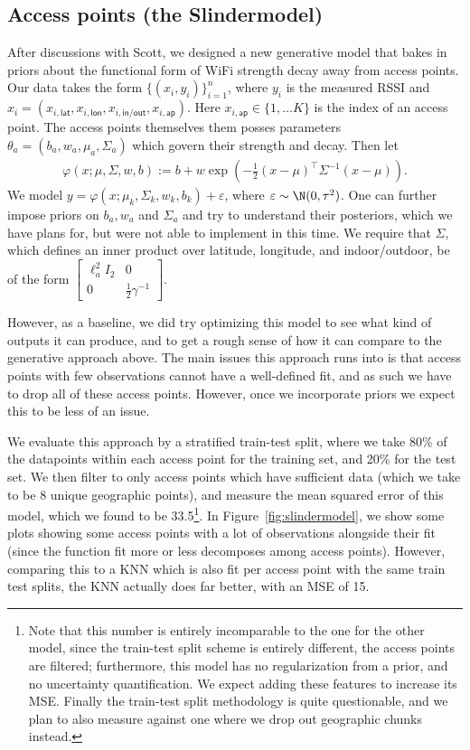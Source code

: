 \documentclass{article}
\newcommand{\sfio}{\mathsf{in/out}}
\newcommand{\sflat}{\mathsf{lat}}
\newcommand{\sflon}{\mathsf{lon}}
\newcommand{\sfap}{\mathsf{ap}}
\begin{document}
\subsection{Access points (the Slindermodel)}
After discussions with Scott, we designed a new generative model that bakes in priors about the functional form of WiFi strength decay away from access points. Our data takes the form $\{(x_i, y_i)\}_{i = 1} ^n$, where $y_i$ is the measured RSSI and $x_i = (x_{i,\sflat}, x_{i,\sflon}, x_{i,\sfio}, x_{i,\sfap})$. Here $x_{i,\sfap} \in \{1, \dots K\}$ is the index of an access point. The access points themselves them posses parameters $\theta_a = (b_a, w_a, \mu_a, \Sigma_a)$ which govern their strength and decay. 
Then let
\begin{align*}
    \varphi(x; \mu, \Sigma, w, b) := b + w \exp\left(-\frac{1}{2} (x - \mu)^\top \Sigma^{-1} (x - \mu) \right).
\end{align*}
We model $y = \varphi(x; \mu_k, \Sigma_k, w_k, b_k) + \varepsilon$, where $\varepsilon \sim \N(0, \tau^2)$. One can further impose priors on $b_a, w_a$ and $\Sigma_a$ and try to understand their posteriors, which we have plans for, but were not able to implement in this time. We require that $\Sigma$, which defines an inner product over latitude, longitude, and indoor/outdoor, be of the form $\begin{bmatrix}
    \ell_a^2 I_2 & 0 \\
    0 & \frac{1}{2} \gamma^{-1}
\end{bmatrix}$.

However, as a baseline, we did try optimizing this model to see what kind of outputs it can produce, and to get a rough sense of how it can compare to the generative approach above. The main issues this approach runs into is that access points with few observations cannot have a well-defined fit, and as such we have to drop all of these access points. However, once we incorporate priors we expect this to be less of an issue. 

We evaluate this approach by a stratified train-test split, where we take 80\% of the datapoints within each access point for the training set, and 20\% for the test set. We then filter to only access points which have sufficient data (which we take to be 8 unique geographic points), and measure the mean squared error of this model, which we found to be 33.5\footnote{Note that this number is entirely incomparable to the one for the other model, since the train-test split scheme is entirely different, the access points are filtered; furthermore, this model has no regularization from a prior, and no uncertainty quantification. We expect adding these features to increase its MSE. Finally the train-test split methodology is quite questionable, and we plan to also measure against one where we drop out geographic chunks instead.}. In Figure~\ref{fig:slindermodel}, we show some plots showing some access points with a lot of observations alongside their fit (since the function fit more or less decomposes among access points). However, comparing this to a KNN which is also fit per access point with the same train test splits, the KNN actually does far better, with an MSE of 15. 
\end{document}
